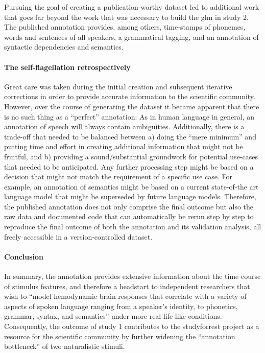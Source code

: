 Pursuing the goal of creating a publication-worthy dataset led to additional
work that goes far beyond the work that was necessary to build the \ac{glm} in
study 2.
The published annotation provides, among others, time-stamps of phonemes, words
and sentences of all speakers, a grammatical tagging, and an annotation of
syntactic dependencies and semantics.


\paragraph{The self-flagellation retrospectively}
%
Great care was taken during the initial creation and subsequent iterative
corrections in order to provide accurate information to the scientific
community.
%
However, over the course of generating the dataset it became apparent that there
is no such thing as a ``perfect'' annotation:
%
As in human language in general, an annotation of speech will always contain
ambiguities.
%
Additionally, there is a trade-off that needed to be balanced between a) doing
the ``mere minimum'' and putting time and effort in creating additional
information that might not be fruitful, and b) providing a sound/substantial
groundwork for potential use-cases that needed to be anticipated.
%
Any further processing step might be based on a decision that might not match
the requirement of a specific use case.
%
For example, an annotation of semantics might be based on a current state-of-the
art language model that might be superseded by future language models.
%
Therefore, the published annotation does not only comprise the final outcome but
also the raw data and documented code that can automatically be rerun step by
step to reproduce the final outcome of both the annotation and its validation
analysis, all freely accessible in a version-controlled dataset.


\paragraph{Conclusion}
%
In summary, the annotation provides extensive information about the time course
of stimulus features, and therefore a headstart to independent researchers that
wish to ``model hemodynamic brain responses that correlate with a variety of
aspects of spoken language ranging from a speaker's identity, to phonetics,
grammar, syntax, and semantics'' \citep{haeusler2021speechanno} under more
real-life like conditions.
%
Consequently, the outcome of study 1 contributes to the studyforrest project as
a resource for the scientific community by further widening the ``annotation
bottleneck'' \citep{aliko2020naturalistic} of two naturalistic stimuli.


